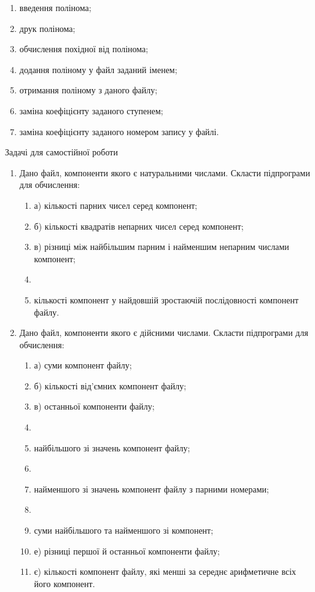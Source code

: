 \documentclass[]{article}
\makeatletter
\newcommand{\xslalph}[1]{\expandafter\@xslalph\csname c@#1\endcsname}
\newcommand{\@xslalph}[1]{%
    \ifcase#1\or а\or б\or в\or г\or д\or e\or є\or ж\or з\or i%
    \or й\or к\or л\or м\or н\or о\or п\or р\or с\or т%
    \or у\or ф\or х\or ц\or ч\or ш\or ю\or я\or аа\or бб\or вв%
    \else\@ctrerr\fi%
}
\makeatother
\begin{document}
\begin{enumerate}
\begin{enumerate}[label=\xslalph*)]
\begin{enumerate}
\begin{enumerate}[label=\xslalph*)]
\begin{enumerate}
\begin{enumerate}[label=\xslalph*)]
\item
введення полінома; 
\item
друк полінома;
\item
обчислення похідної від полінома;
\item
додання поліному у файл заданий іменем;
\item
отримання поліному з даного файлу;
\item
заміна коефіцієнту заданого ступенем;
\item
заміна коефіцієнту заданого номером запису у файлі.
\end{enumerate}

\end{enumerate}


Задачі для самостійної роботи

\begin{enumerate}
\def\labelenumi{\arabic{enumi})}
\item
  Дано файл, компоненти якого є натуральними числами. Скласти
  підпрограми для обчислення:
\begin{enumerate}[label=\xslalph*)]
\item
а) кількості парних чисел серед компонент;
\item
б) кількості квадратів непарних чисел серед компонент;
\item
в) різниці між найбільшим парним і найменшим непарним числами компонент;
\item\item кількості компонент у найдовшій зростаючій послідовності компонент
файлу.
\end{enumerate}

\item
  Дано файл, компоненти якого є дійсними числами. Скласти підпрограми
  для обчислення:
\begin{enumerate}[label=\xslalph*)]
\item
а) суми компонент файлу;
\item
б) кількості від'ємних компонент файлу;
\item
в) останньої компоненти файлу;
\item\item найбільшого зі значень компонент файлу;
\item\item найменшого зі значень компонент файлу з парними номерами;
\item\item суми найбільшого та найменшого зі компонент;
\item
е) різниці першої й останньої компоненти файлу;
\item
є) кількості компонент файлу, які менші за середнє арифметичне всіх його
компонент.
\end{enumerate}


\end{enumerate}
\end{enumerate}
\end{enumerate}
\end{enumerate}
\end{enumerate}
\end{document}
